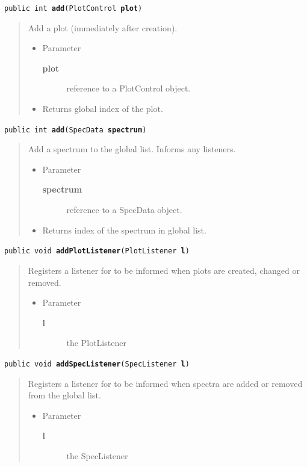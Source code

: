 \documentclass[twoside,11pt]{article}
\renewcommand{\_}{\texttt{\symbol{95}}}
\newcommand{\method}[1]{\texttt{#1}}
\newenvironment{desc}{\begin{quote}}{\end{quote}}
\begin{document}
\method{public int \textbf{add}(\texttt{PlotControl} \textbf{plot})\label{l263}\label{l264}}
\begin{desc}Add a plot (immediately after creation).
\begin{itemize}
\item{Parameter
  \begin{description}
   \item[\textbf{plot}]{reference to a PlotControl object.}
  \end{description}}
\end{itemize}
\begin{itemize}
\item{Returns global index of the plot. }
\end{itemize}
\end{desc}

\method{public int \textbf{add}(\texttt{SpecData} \textbf{spectrum})\label{l265}\label{l266}}
\begin{desc}Add a spectrum to the global list. Informs any listeners.
\begin{itemize}
\item{Parameter
  \begin{description}
   \item[\textbf{spectrum}]{reference to a SpecData object.}
  \end{description}}
\end{itemize}
\begin{itemize}
\item{Returns index of the spectrum in global list. }
\end{itemize}
\end{desc}

\method{public void \textbf{addPlotListener}(\texttt{PlotListener} \textbf{l})\label{l267}\label{l268}}
\begin{desc}Registers a listener for to be informed when plots are
  created, changed or removed.
\begin{itemize}
\item{Parameter
  \begin{description}
   \item[\textbf{l}]{the PlotListener}
  \end{description}}
\end{itemize}
\end{desc}

\method{public void \textbf{addSpecListener}(\texttt{SpecListener} \textbf{l})\label{l269}\label{l270}}
\begin{desc}Registers a listener for to be informed when spectra are added
  or removed from the global list.
\begin{itemize}
\item{Parameter
  \begin{description}
   \item[\textbf{l}]{the SpecListener}
  \end{description}}
\end{itemize}
\end{desc}
\end{document}
